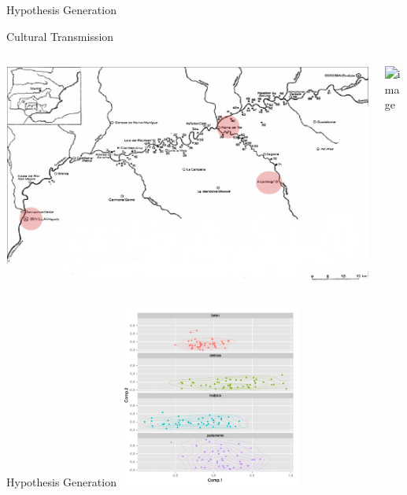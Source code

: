 \documentclass[12pt, notes=show,handout=no]{beamer}
\begin{document}
\begin{frame}{Hypothesis Generation}
\end{frame}



\begin{frame}{Cultural Transmission}
    \begin{columns}
	\begin{column}{.6\textwidth}
	    \includegraphics[width=.9\textwidth]{images/Beti.png}
	\end{column}
	\begin{column}{.3\textwidth}
	     \includegraphics<2->[width=.9\textwidth]{images/mesures.png}
	\end{column}
    \end{columns}

\end{frame}


\begin{frame}{Hypothesis Generation}
	\includegraphics[height=6cm]{images/pca.png}
\end{frame}
\end{document}
